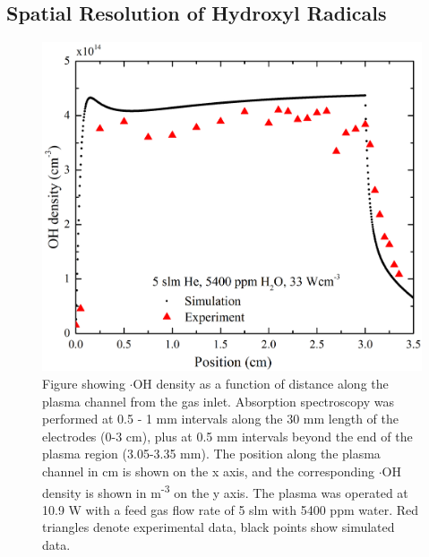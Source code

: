 \documentclass[11pt, oneside]{article}   	%
\begin{document}
\subsection{Spatial Resolution of Hydroxyl Radicals} \label{subsec:SpatialRes}

\begin{figure}
    \centering
    \includegraphics[width=\textwidth]{Figures/OHSpatialwithSimReal}
    \caption{Figure showing $\cdot$OH density as a function of distance along the plasma channel from the gas inlet. Absorption spectroscopy was performed at 0.5 - 1 mm intervals along the 30 mm length of the electrodes (0-3 cm), plus at 0.5 mm intervals beyond the end of the plasma region (3.05-3.35 mm). The position along the plasma channel in cm is shown on the x axis, and the corresponding $\cdot$OH density is shown in m\textsuperscript{-3} on the y axis. The plasma was operated at 10.9 W with a feed gas flow rate of 5 slm with 5400 ppm water. Red triangles denote experimental data, black points show simulated data.}
    \label{fig:SpatialRes}
\end{figure}
\end{document}
